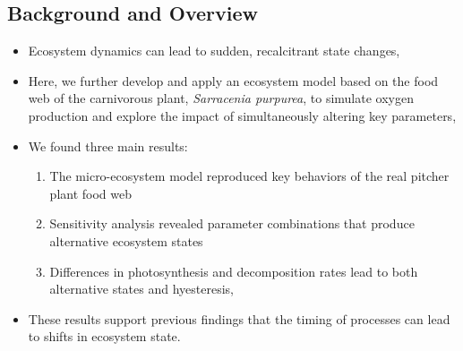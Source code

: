 \documentclass[a0,landscape]{a0poster}
\begin{document}
\begin{multicols}{3} %


\color{DarkBlue} %

\section*{Background and Overview}
  
  \begin{itemize}
  \item Ecosystem dynamics can lead to sudden, recalcitrant state changes,
  \item Here, we further develop and apply an ecosystem model based on
    the food web of the carnivorous plant, \textit{Sarracenia
      purpurea}, to simulate oxygen production and explore the impact
    of simultaneously altering key parameters,
  \item We found three main results:
    \begin{enumerate}
    \item The micro-ecosystem model reproduced key behaviors of
      the real pitcher plant food web
    \item Sensitivity analysis revealed parameter combinations that
      produce alternative ecosystem states
    \item Differences in photosynthesis and decomposition rates lead
      to both alternative states and hyesteresis,
    \end{enumerate}
  \item These results support previous findings that the timing of
    processes can lead to shifts in ecosystem state. 
  \end{itemize}





\end{multicols}
\end{document}

